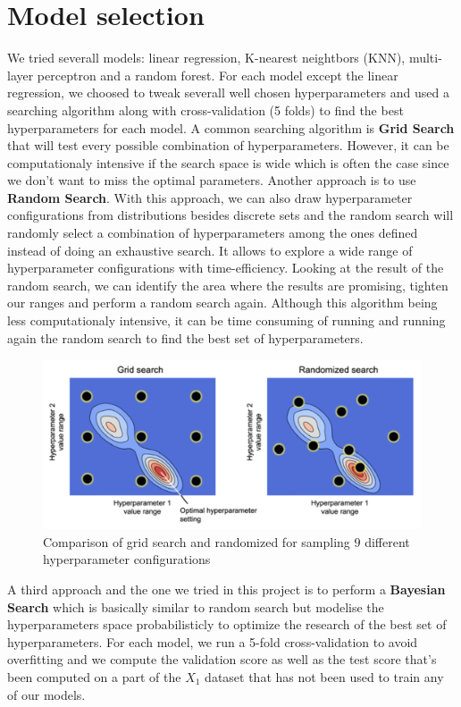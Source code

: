 \section{Model selection}

We tried severall models: linear regression, K-nearest neightbors (KNN), multi-layer perceptron and a random forest. For each model except the linear regression, we choosed to tweak severall well chosen hyperparameters and used a searching algorithm along with cross-validation (5 folds) to find the best hyperparameters for each model. A common searching algorithm is \textbf{Grid Search} that will test every possible combination of hyperparameters. However, it can be computationaly intensive if the search space is wide which is often the case since we don't want to miss the optimal parameters. Another approach is to use \textbf{Random Search}. With this approach, we can also draw hyperparameter configurations from distributions besides discrete sets and the random search will randomly select a combination of hyperparameters among the ones defined instead of doing an exhaustive search. It allows to explore a wide range of hyperparameter configurations with time-efficiency. Looking at the result of the random search, we can identify the area where the results are promising, tighten our ranges and perform a random search again. Although this algorithm being less computationaly intensive, it can be time consuming of running and running again the random search to find the best set of hyperparameters. 

\begin{figure}[H]
	\centering
	\includegraphics{figures/grid_search_vs_random_search.png}
	\caption{Comparison of grid search and randomized for sampling $9$ different hyperparameter configurations}
	\label{fig:gridsearch_vs_randomsearch}
\end{figure}

A third approach and the one we tried in this project is to perform a \textbf{Bayesian Search} which is basically similar to random search but modelise the hyperparameters space probabilisticly to optimize the research of the best set of hyperparameters. For each model, we run a 5-fold cross-validation to avoid overfitting and we compute the validation score as well as the test score that's been computed on a part of the $X_1$ dataset that has not been used to train any of our models.

